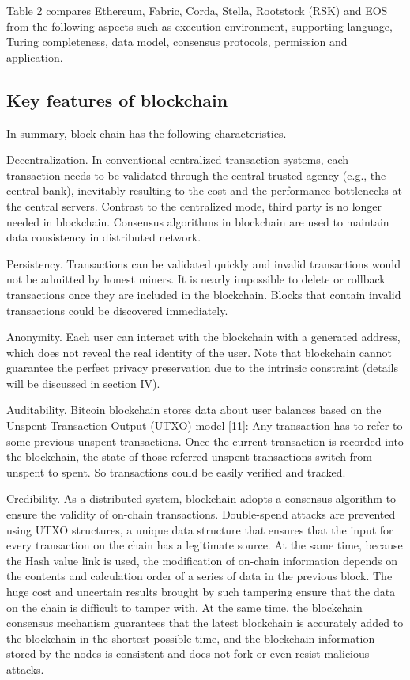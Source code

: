 \documentclass[lettersize,journal]{IEEEtran}
\begin{document}
Table 2 compares  Ethereum, Fabric, Corda, Stella, Rootstock (RSK) and EOS from the following  aspects such as execution environment, supporting language, Turing completeness, data model, consensus protocols, permission and application.


\subsection{Key features of blockchain}
In summary, block chain has the following characteristics.

Decentralization. In conventional centralized transaction systems, each transaction needs to be validated through the central trusted agency (e.g., the central bank), inevitably resulting to the cost and the performance bottlenecks at the central servers. Contrast to the centralized mode, third party is no longer needed in blockchain. Consensus algorithms in blockchain are used to maintain data consistency in distributed network.

Persistency. Transactions can be validated quickly and invalid transactions would not be admitted by honest miners. It is nearly impossible to delete or rollback transactions once they are included in the blockchain. Blocks that contain invalid transactions could be discovered immediately.

Anonymity. Each user can interact with the blockchain with a generated address, which does not reveal the real identity of the user. Note that blockchain cannot guarantee the perfect privacy preservation due to the intrinsic constraint (details will be discussed in section IV).

Auditability. Bitcoin blockchain stores data about user balances based on the Unspent Transaction Output (UTXO) model [11]: Any transaction has to refer to some previous unspent transactions. Once the current transaction is recorded into the blockchain, the state of those referred unspent transactions switch from unspent to spent. So transactions could be easily verified and tracked.

Credibility. As a distributed system, blockchain adopts a consensus algorithm to ensure the validity of on-chain transactions. Double-spend attacks are prevented using UTXO structures, a unique data structure that ensures that the input for every transaction on the chain has a legitimate source. At the same time, because the Hash value link is used, the modification of on-chain information depends on the contents and calculation order of a series of data in the previous block. The huge cost and uncertain results brought by such tampering ensure that the data on the chain is difficult to tamper with. At the same time, the blockchain consensus mechanism guarantees that the latest blockchain is accurately added to the blockchain in the shortest possible time, and the blockchain information stored by the nodes is consistent and does not fork or even resist malicious attacks.
\end{document}
